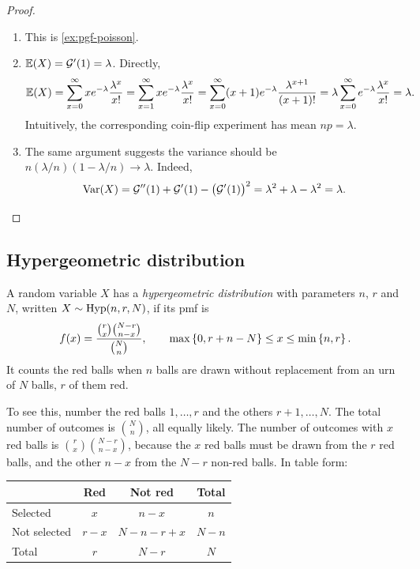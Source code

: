 \begin{proof}\leavevmode
\begin{enumerate}[leftmargin=*]
  \item[1.] This is \cref{ex:pgf-poisson}.
  \item[2.] $\operatorname{\mathbb{E}}(X) = \mathcal{G}'(1) = \lambda$. Directly,
\[
  \operatorname{\mathbb{E}}(X) = \sum_{x=0}^\infty x e^{-\lambda} \frac{\lambda^x}{x!} = \sum_{x=1}^\infty x e^{-\lambda} \frac{\lambda^x}{x!} = \sum_{x=0}^\infty (x+1) e^{-\lambda} \frac{\lambda^{x+1}}{(x+1)!} = \lambda \sum_{x=0}^\infty e^{-\lambda} \frac{\lambda^x}{x!} = \lambda.
\]
Intuitively, the corresponding coin-flip experiment has mean $np = \lambda$.
  \item[3.] The same argument suggests the variance should be $n(\lambda/n)(1 - \lambda/n) \to \lambda$. Indeed,
\[
  \operatorname{Var}(X) = \mathcal{G}''(1) + \mathcal{G}'(1) - \bigl(\mathcal{G}'(1)\bigr)^2 = \lambda^2 + \lambda - \lambda^2 = \lambda. \qedhere
  \]
\end{enumerate}
\end{proof}

\subsection{Hypergeometric distribution}\label{sec:hypergeometric}

\begin{definition}\label{def:hypergeometric}
A random variable $X$ has a \emph{hypergeometric distribution} with parameters $n$, $r$ and $N$, written $X \sim \mathrm{Hyp}(n, r, N)$, if its pmf is
\[
  f(x) = \frac{\binom{r}{x} \binom{N - r}{n - x}}{\binom{N}{n}}, \qquad \max\left\{ 0, r + n - N \right\} \le x \le \min\left\{ n, r \right\}.
\]
It counts the red balls when $n$ balls are drawn without replacement from an urn of $N$ balls, $r$ of them red.
\end{definition}

To see this, number the red balls $1, \ldots, r$ and the others $r + 1, \ldots, N$. The total number of outcomes is $\binom{N}{n}$, all equally likely. The number of outcomes with $x$ red balls is $\binom{r}{x} \binom{N - r}{n - x}$, because the $x$ red balls must be drawn from the $r$ red balls, and the other $n - x$ from the $N - r$ non-red balls. In table form:
\begin{center}
\begin{tabular}{@{}lccc@{}}
\toprule
 & Red & Not red & Total \\
\midrule
Selected & $x$ & $n - x$ & $n$ \\
Not selected & $r - x$ & $N - n - r + x$ & $N - n$ \\
Total & $r$ & $N - r$ & $N$ \\
\bottomrule
\end{tabular}
\end{center}

